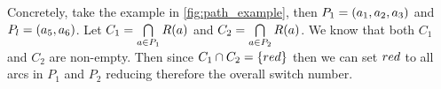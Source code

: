 Concretely, take the example in \cref{fig:path_example}, then $P_1 = (a_1, a_2, a_3)$ and $P_l = (a_5, a_6)$. Let $C_1 = \bigcap\limits_{a\in P_1} R(a)$ and $C_2 = \bigcap\limits_{a\in P_2} R(a)$. We know that both $C_1$ and $C_2$ are non-empty. Then since $C_1 \cap C_2 = \{red\}$ then we can set $red$ to all arcs in $P_1$ and $P_2$ reducing therefore the overall switch number.

